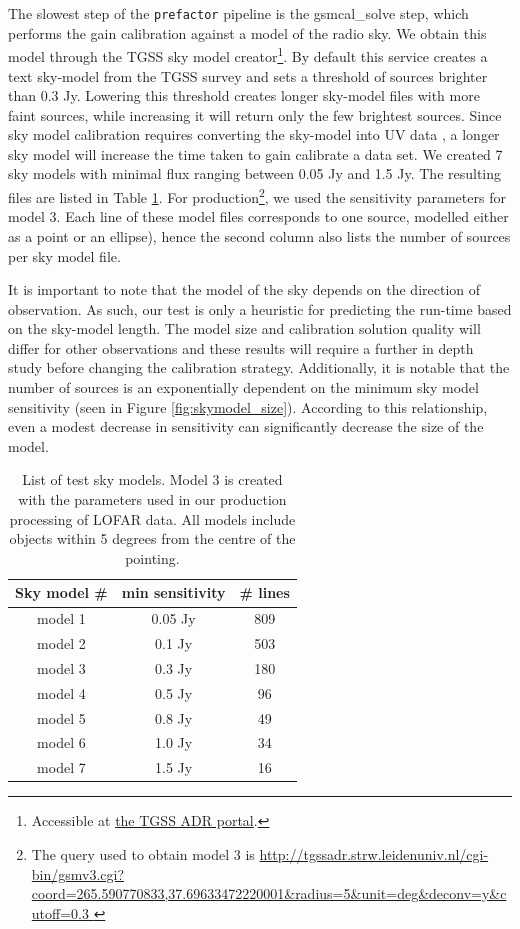 The slowest step of the \texttt{prefactor} pipeline is the gsmcal\_solve step, which performs the gain calibration against a model of the radio sky. We obtain this model through the TGSS sky model creator\footnote{Accessible at \href{http://tgssadr.strw.leidenuniv.nl/doku.php}{the TGSS ADR portal}.}. By default this service creates a text sky-model from the TGSS survey \citep{tgssadr} and sets a threshold of sources brighter than 0.3 Jy. Lowering this threshold creates longer sky-model files with more faint sources, while increasing it will return only the few brightest sources. Since sky model calibration requires converting the sky-model into UV data \citep{dppp}, a longer sky model will increase the time taken to gain calibrate a data set. We created 7 sky models with minimal flux ranging between 0.05 Jy and 1.5 Jy. The resulting files are listed in Table \ref{table:skymodels}. For production\footnote{The query used to obtain model 3 is \url{http://tgssadr.strw.leidenuniv.nl/cgi-bin/gsmv3.cgi?coord=265.590770833,37.69633472220001\&radius=5\&unit=deg\&deconv=y\&cutoff=0.3 }}, we used the sensitivity parameters for model 3. Each line of these model files corresponds to one source, modelled either as a point or an ellipse), hence the second column also lists the number of sources per sky model file.

It is important to note that the model of the sky depends on the direction of observation. As such, our test is only a heuristic for predicting the run-time based on the sky-model length. The model size and calibration solution quality will differ for other observations and these results will require a further in depth study before changing the calibration strategy. Additionally, it is notable that the number of sources is an exponentially dependent on the minimum sky model sensitivity (seen in Figure \ref{fig:skymodel_size}). According to this relationship, even a modest decrease in sensitivity can significantly decrease the size of the model.

\begin{table}[h!]
\centering
\begin{tabular}{||c| c c||} 
 \hline
 Sky model \# & min sensitivity & \# lines  \\ [0.5ex] 
 \hline
 model 1 & 0.05 Jy & 809    \\ 
 model 2 & 0.1 Jy & 503   \\
 \rowcolor{Gray}
  \hline
 model 3 & 0.3 Jy & 180   \\
  \hline
 model 4 & 0.5 Jy & 96  \\
 model 5 & 0.8 Jy & 49   \\ 
 model 6 & 1.0 Jy & 34   \\
 model 7 & 1.5 Jy & 16   \\[1ex] 
 \hline
\end{tabular}
\caption{List of test sky models. Model 3 is created with the parameters used in our production processing of LOFAR data. All models include objects within 5 degrees from the centre of the pointing.  }
\label{table:skymodels}
\end{table}


